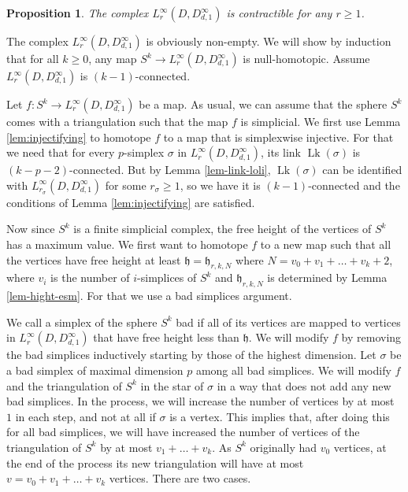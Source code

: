 \documentclass[11pt, a4paper]{amsart}
\newtheorem{prop}[thm]{Proposition}
\theoremstyle{definition}
\DeclareMathOperator{\Lk}{Lk}
\def\Proof{\noindent{\bf Proof.}\quad}
\begin{document}
\begin{prop}\label{prop-Tn-inf}
The complex $L_r^{\infty}(D,D^{\infty}_{d,1})$ is contractible for any $r\geq 1$.
\end{prop}

\Proof The complex $L_r^{\infty}(D,D^{\infty}_{d,1})$ is obviously non-empty. We will show by induction that for all $k\geq 0$, any map $S^k \rightarrow  L_r^{\infty}(D,D^{\infty}_{d,1})$ is null-homotopic. Assume $L_r^{\infty}(D,D^{\infty}_{d,1})$ is $(k-1)$-connected. 


Let $f : S^k \rightarrow  L_r^{\infty}(D,D^{\infty}_{d,1})$ be  a map. As usual, we can assume that the sphere $S^k$ comes with a triangulation such that the map $f$ is simplicial. We first use Lemma \ref{lem:injectifying} to homotope $f$ to a map that is simplexwise injective. For that we need that for every $p$-simplex $\sigma$ in $L_r^{\infty}(D,D^{\infty}_{d,1})$, its link $\Lk{(\sigma)}$ is $(k-p-2)$-connected. But by Lemma \ref{lem-link-loli}, $\Lk({\sigma})$ can be identified with $L_{r_\sigma}^{\infty}(D,D^{\infty}_{d,1})$ for some $r_\sigma\geq 1$, so we have it is $(k-1)$-connected and the conditions of Lemma \ref{lem:injectifying}  are satisfied.  


Now since $S^k$ is a finite simplicial complex,  the  free height of the vertices of $S^k$ has a maximum value. We first want to homotope $f$ to a new map such that all the vertices have free height at least $\mathfrak{h}=\mathfrak{h}_{r,k,N}$ where $N =v_0+v_1+\dots+v_k+2$, where $v_i$ is the number of $i$-simplices of $S^k$ and $\mathfrak{h}_{r,k,N}$ is determined by Lemma \ref{lem-hight-esm}. For that we use a bad simplices argument.

We call a simplex of the sphere $S^k$ bad if all of its vertices are mapped to vertices in $ L_r^{\infty}(D,D^{\infty}_{d,1})$ that have free height less than $\mathfrak{h}$.
We will modify $f$ by removing the bad simplices inductively starting by those of the highest dimension. 
Let $\sigma$ be a bad simplex of maximal dimension $p$ among all bad simplices. We will modify $f$ and the triangulation of $S^k$ in the star of $\sigma$ in a way that does not add any new bad simplices. In the process, we will increase the number of vertices by at most $1$ in each step, and not at all if $\sigma$ is a vertex. 
This implies that, after doing this for all bad simplices, we will have increased the number of vertices of the triangulation of $S^k$ by at most $v_1+\dots+v_k$. As $S^k$ originally had $v_0$ vertices, at the end of the process its new triangulation will  have at most $v=v_0+v_1+\dots+v_k$ vertices. There are two cases.
\end{document}
